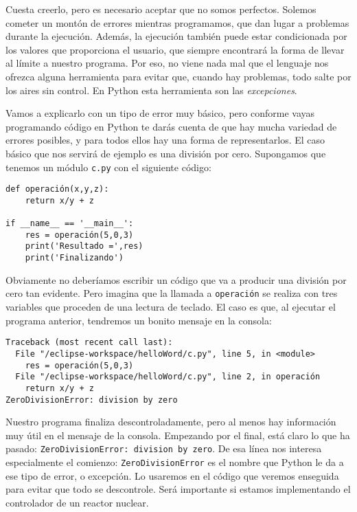 Cuesta creerlo, pero es necesario aceptar que no somos perfectos. Solemos cometer un montón de errores mientras programamos, que dan lugar a problemas durante la ejecución. Además, la ejecución también puede estar condicionada por los valores que proporciona el usuario, que siempre encontrará la forma de llevar al límite a nuestro programa. Por eso, no viene nada mal que el lenguaje nos ofrezca alguna herramienta para evitar que, cuando hay problemas, todo salte por los aires sin control. En Python esta herramienta son las \emph{excepciones}. 

Vamos a explicarlo con un tipo de error muy básico, pero conforme vayas programando código en Python te darás cuenta de que hay mucha variedad de errores posibles, y para todos ellos hay una forma de representarlos. El caso básico que nos servirá de ejemplo es una división por cero. Supongamos que tenemos un módulo \texttt{c.py} con el siguiente código:

\begin{lstlisting}
def operación(x,y,z):
    return x/y + z

if __name__ == '__main__':
    res = operación(5,0,3)
    print('Resultado =',res)
    print('Finalizando')
\end{lstlisting}

Obviamente no deberíamos escribir un código que va a producir una división por cero tan evidente. Pero imagina que la llamada a \texttt{operación} se realiza con tres variables que proceden de una lectura de teclado. El caso es que, al ejecutar el programa anterior, tendremos un bonito mensaje en la consola:

\begin{lstlisting}
Traceback (most recent call last):
  File "/eclipse-workspace/helloWord/c.py", line 5, in <module>
    res = operación(5,0,3)
  File "/eclipse-workspace/helloWord/c.py", line 2, in operación
    return x/y + z
ZeroDivisionError: division by zero
\end{lstlisting}

Nuestro programa finaliza descontroladamente, pero al menos hay información muy útil en el mensaje de la consola. Empezando por el final, está claro lo que ha pasado: \texttt{ZeroDivisionError: division by zero}. De esa línea nos interesa especialmente el comienzo: \texttt{ZeroDivisionError} es el nombre que Python le da a ese tipo de error, o excepción. Lo usaremos en el código que veremos enseguida para evitar que todo se descontrole. Será importante si estamos implementando el controlador de un reactor nuclear.

